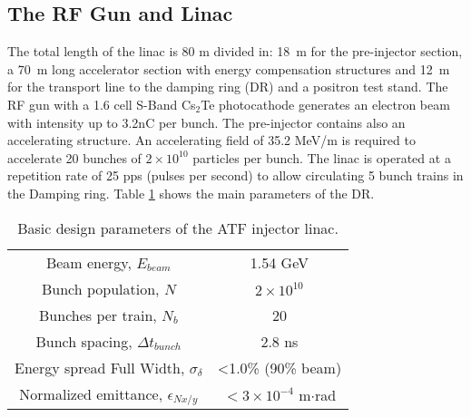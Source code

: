 \subsection{The RF Gun and Linac}
The total length of the linac is 80 m divided in: 18~m for the pre-injector section, a 70~m long accelerator section with energy compensation structures and 12~m for the transport line to the damping ring (DR) and a positron test stand.
The RF gun with a 1.6 cell S-Band Cs$_2$Te photocathode generates an electron beam with intensity up to 3.2nC per bunch. The pre-injector contains also an accelerating structure. An accelerating field of 35.2 MeV/m is required to accelerate 20 bunches of $2\times10^{10}$ particles per bunch. The linac is operated at a repetition rate of 25 pps (pulses per second) to allow circulating 5 bunch trains in the Damping ring. Table \ref{t:linac} shows the main parameters of the DR.
\begin{table}[hbt]
\centering
 \begin{tabular}{|c|c|}\hline
 Beam energy, $E_{beam}$& 1.54 GeV \\
 Bunch population, $N$& $2\times10^{10}$ \\
 Bunches per train, $N_b$ & 20 \\
 Bunch spacing, $\Delta t_{bunch}$ & 2.8 ns\\
 Energy spread Full Width, $\sigma_\delta$ & <1.0\% (90\% beam)\\
 Normalized emittance, $\epsilon_{Nx/y}$ & $< 3\times 10^{-4}$ m$\cdot$rad\\\hline
 \end{tabular}
 \caption{Basic design parameters of the ATF injector linac.}\label{t:linac}
\end{table}
